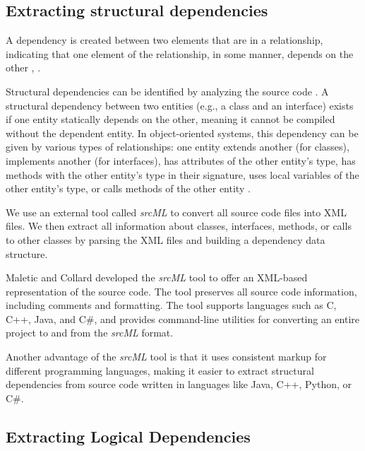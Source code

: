 \subsection{Extracting structural dependencies}
\label{subsec:extracting_structural_dependencies}

\hspace{4em}A dependency is created between two elements that are in a relationship, indicating that one element of the relationship, in some manner, depends on the other \cite{Booch:2004:OAD:975416}, \cite{Cataldo2009SoftwareDW}.

Structural dependencies can be identified by analyzing the source code \cite{structdep}. A structural dependency between two entities (e.g., a class and an interface) exists if one entity statically depends on the other, meaning it cannot be compiled without the dependent entity. In object-oriented systems, this dependency can be given by various types of relationships: one entity extends another (for classes), implements another (for interfaces), has attributes of the other entity's type, has methods with the other entity's type in their signature, uses local variables of the other entity's type, or calls methods of the other entity \cite{Sangal:2005:UDM:1094811.1094824, CalloArias2011, 1199197}.

We use an external tool called \textit{srcML} \cite{srcML} to convert all source code files into XML files. We then extract all information about classes, interfaces, methods, or calls to other classes by parsing the XML files and building a dependency data structure. 

Maletic and Collard \cite{srcMLCollard, Collard:2011:LTF:2067850.2068011, CollardsrcML2005} developed the \textit{srcML} tool to offer an XML-based representation of the source code. The tool preserves all source code information, including comments and formatting. The tool supports languages such as C, C++, Java, and C\#, and provides command-line utilities for converting an entire project to and from the \textit{srcML} format. 

Another advantage of the \textit{srcML} tool is that it uses consistent markup for different programming languages, making it easier to extract structural dependencies from source code written in languages like Java, C++, Python, or C\#.



\subsection{Extracting Logical Dependencies}
\label{subsec:extracting_logical_dependencies}


